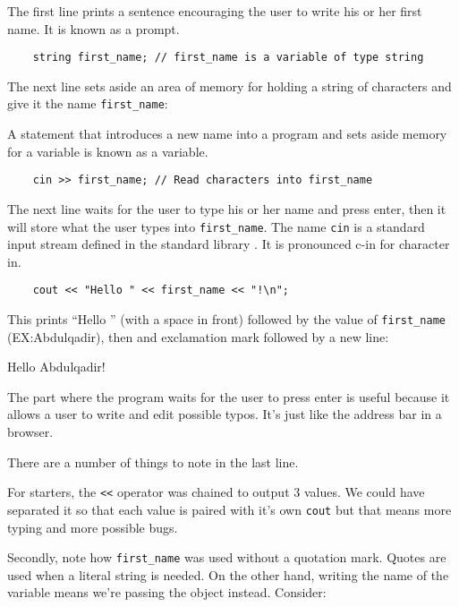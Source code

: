 \documentclass{book}
\begin{document}
The first line prints a sentence encouraging the user to write his or her first name. It is known as a prompt.

\begin{verbatim}
	string first_name; // first_name is a variable of type string
\end{verbatim}

The next line sets aside an area of memory for holding a string of characters and give it the name \verb|first_name|:

A statement that introduces a new name into a program and sets aside memory for a variable is known as a variable.

\begin{verbatim}
	cin >> first_name; // Read characters into first_name
\end{verbatim}

The next line waits for the user to type his or her name and press enter, then it will store what the user types into \verb|first_name|. The name \verb|cin| is a standard input stream defined in the standard library . It is pronounced c-in for character in.

\begin{verbatim}
	cout << "Hello " << first_name << "!\n";
\end{verbatim}

This prints ``Hello '' (with a space in front) followed by the value of \verb|first_name| (EX:\@ Abdulqadir), then and exclamation mark followed by a new line:

\begin{verb}
Hello Abdulqadir!

\end{verb}

The part where the program waits for the user to press enter is useful because it allows a user to write and edit possible typos. It's just like the address bar in a browser.

There are a number of things to note in the last line.

For starters, the \verb|<<| operator was chained to output 3 values. We could have separated it so that each value is paired with it's own \verb|cout| but that means more typing and more possible bugs.

Secondly, note how \verb|first_name| was used without a quotation mark. Quotes are used when a literal string is needed. On the other hand, writing the name of the variable means we're passing the object instead. Consider:
\end{document}
